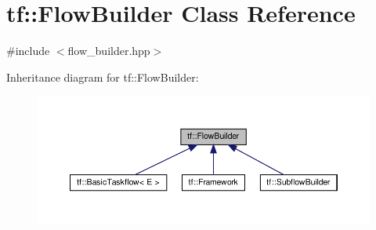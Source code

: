 \hypertarget{classtf_1_1FlowBuilder}{}\section{tf\+:\+:Flow\+Builder Class Reference}
\label{classtf_1_1FlowBuilder}


{\ttfamily \#include $<$flow\+\_\+builder.\+hpp$>$}



Inheritance diagram for tf\+:\+:Flow\+Builder\+:\nopagebreak
\begin{figure}[H]
\begin{center}
\leavevmode
\includegraphics[width=350pt]{classtf_1_1FlowBuilder__inherit__graph}
\end{center}
\end{figure}
